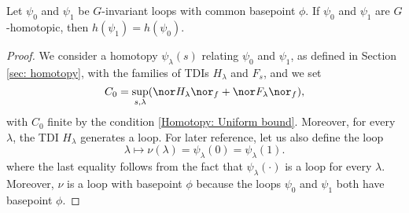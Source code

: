 \begin{proposition} \label{prop: homotopy invariance products}
	Let $\psi_0$ and $\psi_1$ be $G$-invariant loops with common basepoint $\phi$. If  $\psi_0$ and $\psi_1$ are $G$-homotopic, then $h(\psi_1)=h(\psi_0)$.
\end{proposition}
\begin{proof}
	We consider a homotopy $\psi_\lambda(s)$ relating $\psi_0$ and $\psi_1$, as defined in Section \ref{sec: homotopy}, with the families of TDIs $H_\lambda$ and $F_s$,  and we set
	$$
	C_0= \sup_{s,\lambda} ( \nor H_\lambda \nor_f+ \nor F_\lambda \nor_f ),
	$$
	with $C_0$ finite by the condition \eqref{Homotopy: Uniform bound}.
	Moreover,  for every $\lambda$, the TDI  $H_\lambda$ generates a loop.
	For later reference, let us also define the loop 
	\begin{equation}\label{eq: funny loop nu}
	\lambda\mapsto \nu(\lambda)= \psi_\lambda(0)=\psi_\lambda(1).
	\end{equation}
	where the last equality follows from the fact that $\psi_\lambda(\cdot)$ is a loop for every $\lambda$. Moreover, $\nu$ is a loop with basepoint $\phi$ because the loops $\psi_0$ and $\psi_1$ both have basepoint $\phi$.
	

\end{proof}
